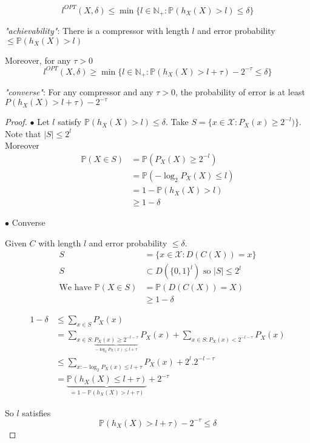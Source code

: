 


\begin{prop}
\[l^{OPT}(X,\delta)\leq \min \{ l\in \mathbb{N}_+ : \mathbb{P}(h_X(X)>l)\leq \delta\}\]

\emph{"achievability"}: There is a compressor with length $l$ and error probability $\leq \mathbb{P}(h_X(X)>l)$

Moreover, for any $\tau > 0$
\[l^{OPT}(X,\delta)\geq \min \{ l\in \mathbb{N}_+: \mathbb{P}(h_X(X)>l+\tau) - 2^{-\tau}\leq \delta\}\]

\emph{"converse"}: For any compressor and any $\tau > 0$, the probability of error is at least $P(h_X(X)>l+\tau)-2^{-\tau}$
\end{prop}

\begin{proof}
$\bullet$ Let $l$ satisfy $\mathbb{P}(h_X(X)>l)\leq \delta $. Take $S=\{x\in \mathcal{X}: P_X(x)\geq 2^{-l})\}$.\\
Note that $|S|\leq 2^l$\\
Moreover
\begin{align*}
\mathbb{P}(X\in S) & = \mathbb{P}(P_X(X)\geq 2^{-l})\\
& = \mathbb{P}(-\log_2 P_X(X) \leq l)\\
& = 1 - \mathbb{P}(h_X(X)>l)\\
& \geq 1-\delta
\end{align*}


$\bullet$ Converse

Given $C$ with length $l$ and error probability $\leq \delta$.
\begin{align*}
S & = \{ x\in \mathcal{X}: D(C(X))=x \}\\
S & \subset D(\{0,1\}^l) \text{ so } |S|\leq 2^l\\
\text{We have } \mathbb{P}(X\in S) & = \mathbb{P} (D(C(X))=X)\\
& \geq 1 - \delta
\end{align*}

\begin{align*}
1-\delta & \leq \sum_{x\in S} P_X(x)\\
& = \sum_{x\in S: \underbrace{P_X(x)\geq 2^{-l-\tau}}_{-\log_2 P_X(x)\leq l+\tau}} P_X(x)+\sum_{x\in S:P_X(x)<2^{-l-\tau}} P_X(x)\\
& \leq \sum_{x:-\log_2 P_X(x)\leq l+\tau}P_X(x) + 2^{l}.2^{-l-\tau}\\
& = \underbrace{\mathbb{P}(h_X(X)\leq l+\tau)}_{=1-\mathbb{P}(h_X(X)>l+\tau)} + 2^{-\tau}
\end{align*}


So $l$ satisfies
\[\mathbb{P} ( h_X(X)>l+\tau) - 2^{-\tau} \leq \delta\]
\end{proof}

